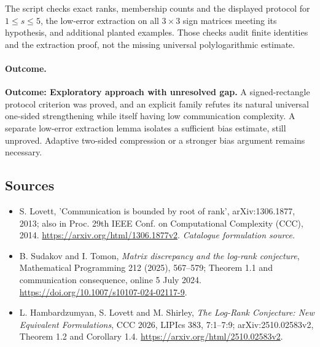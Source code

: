 \documentclass[11pt,a4paper]{article}
\numberwithin{equation}{section}
\begin{document}
The script checks exact ranks, membership counts and the displayed protocol
for $1\le s\le5$, the low-error extraction on all $3\times3$ sign matrices
meeting its hypothesis, and additional planted examples. Those checks audit
finite identities and the extraction proof, not the missing universal
polylogarithmic estimate.

\paragraph{Outcome.}
\textbf{Outcome: Exploratory approach with unresolved gap.}
A signed-rectangle protocol criterion was proved, and an explicit family
refutes its natural universal one-sided strengthening while itself having
low communication complexity. A separate low-error extraction lemma isolates
a sufficient bias estimate, still unproved. Adaptive two-sided compression
or a stronger bias argument remains necessary.

\subsection{Sources}
\begin{itemize}\raggedright
\item[\textnormal{[S1]}]\hypertarget{source:statement:1}{} S. Lovett, 'Communication is bounded by root of rank', arXiv:1306.1877, 2013; also in Proc. 29th IEEE Conf. on Computational Complexity (CCC), 2014.
\url{https://arxiv.org/html/1306.1877v2}.
{\small\textit{Catalogue formulation source.}}
\item[\textnormal{[E1]}]\hypertarget{extra:statement:1}{} B. Sudakov and I. Tomon,
\emph{Matrix discrepancy and the log-rank conjecture}, Mathematical Programming
212 (2025), 567--579; Theorem 1.1 and communication consequence, online
5 July 2024. \url{https://doi.org/10.1007/s10107-024-02117-9}.
\item[\textnormal{[E2]}]\hypertarget{extra:statement:2}{} L. Hambardzumyan, S. Lovett
and M. Shirley, \emph{The Log-Rank Conjecture: New Equivalent Formulations},
CCC 2026, LIPIcs 383, 7:1--7:9; arXiv:2510.02583v2, Theorem 1.2 and
Corollary 1.4. \url{https://arxiv.org/html/2510.02583v2}.

\end{itemize}
\end{document}
